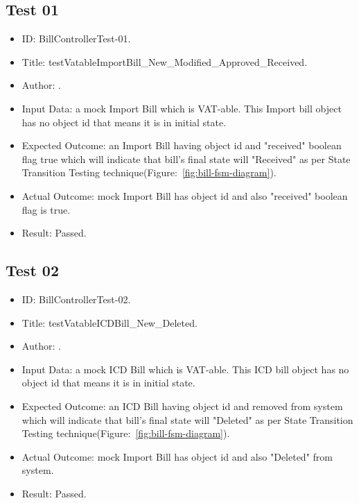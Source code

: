 \documentclass[12pt]{article}
\makeatletter
\let\theauthor\@author
\makeatother
\begin{document}
\subsection{Test 01}
\begin{itemize}
	
    \item ID: BillControllerTest-01.
    
    \item Title: testVatableImportBill\_New\_Modified\_Approved\_Received.
    
    \item Author: \theauthor.
    
    \item Input Data: a mock Import Bill which is VAT-able. This Import bill object has no object id that means it is in initial state.
    
    \item Expected Outcome: an Import Bill having object id and "received" boolean flag true which will indicate that bill's final state will "Received" as per State Transition Testing technique(Figure:~\ref{fig:bill-fsm-diagram}).
    
    \item Actual Outcome: mock Import Bill has object id and also "received" boolean flag is true.
    
    \item Result: Passed.

\end{itemize}

\subsection{Test 02}
\begin{itemize}
	
    \item ID: BillControllerTest-02.
    
    \item Title: testVatableICDBill\_New\_Deleted.
    
    \item Author: \theauthor.
    
    \item Input Data: a mock ICD Bill which is VAT-able. This ICD bill object has no object id that means it is in initial state.
    
    \item Expected Outcome: an ICD Bill having object id and removed from system which will indicate that bill's final state will "Deleted" as per State Transition Testing technique(Figure:~\ref{fig:bill-fsm-diagram}).
    
    \item Actual Outcome: mock Import Bill has object id and also "Deleted" from system.
    
    \item Result: Passed.

\end{itemize}
\end{document}
